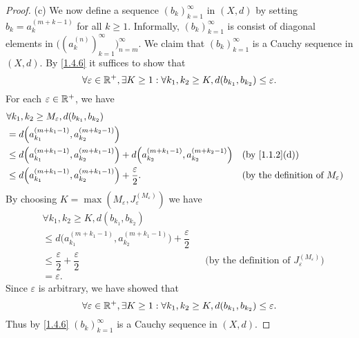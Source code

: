 \begin{proof}{(c)}
  We now define a sequence \((b_k)_{k = 1}^\infty\) in \((X, d)\) by setting \(b_k = a_k^{(m + k - 1)}\) for all \(k \geq 1\).
  Informally, \((b_k)_{k = 1}^\infty\) is consist of diagonal elements in \(\big((a_k^{(n)})_{k = 1}^\infty\big)_{n = m}^\infty\).
  We claim that \((b_k)_{k = 1}^\infty\) is a Cauchy sequence in \((X, d)\).
  By \cref{1.4.6} it suffices to show that
  \[
    \forall \varepsilon \in \mathbb{R}^+, \exists K \geq 1 : \forall k_1, k_2 \geq K, d(b_{k_1}, b_{k_2}) \leq \varepsilon.
  \]
  For each \(\varepsilon \in \mathbb{R}^+\), we have
  \begin{align*}
     & \forall k_1, k_2 \geq M_\varepsilon, d(b_{k_1}, b_{k_2})                                                                                                                            \\
     & = d\Big(a_{k_1}^{(m + k_1 - 1)}, a_{k_2}^{(m + k_2 - 1)}\Big)                                                                                                                       \\
     & \leq d\Big(a_{k_1}^{(m + k_1 - 1)}, a_{k_2}^{(m + k_1 - 1)}\Big) + d\Big(a_{k_2}^{(m + k_1 - 1)}, a_{k_2}^{(m + k_2 - 1)}\Big) &  & \text{(by \cref{1.1.2}(d))}                     \\
     & \leq d\Big(a_{k_1}^{(m + k_1 - 1)}, a_{k_2}^{(m + k_1 - 1)}\Big) + \dfrac{\varepsilon}{2}.                                     &  & \text{(by the definition of \(M_\varepsilon\))}
  \end{align*}
  By choosing \(K = \max(M_\varepsilon, J_\varepsilon^{(M_\varepsilon)})\) we have
  \begin{align*}
     & \forall k_1, k_2 \geq K, d(b_{k_1}, b_{k_2})                                                                                                                     \\
     & \leq d\Big(a_{k_1}^{(m + k_1 - 1)}, a_{k_2}^{(m + k_1 - 1)}\Big) + \dfrac{\varepsilon}{2}                                                                        \\
     & \leq \dfrac{\varepsilon}{2} + \dfrac{\varepsilon}{2}                                      &  & \text{(by the definition of \(J_\varepsilon^{(M_\varepsilon)}\))} \\
     & = \varepsilon.
  \end{align*}
  Since \(\varepsilon\) is arbitrary, we have showed that
  \[
    \forall \varepsilon \in \mathbb{R}^+, \exists K \geq 1 : \forall k_1, k_2 \geq K, d(b_{k_1}, b_{k_2}) \leq \varepsilon.
  \]
  Thus by \cref{1.4.6} \((b_k)_{k = 1}^\infty\) is a Cauchy sequence in \((X, d)\).


\end{proof}
